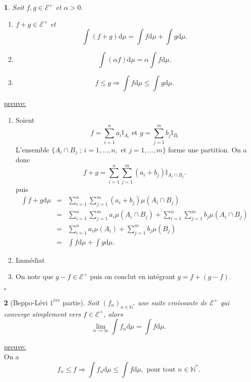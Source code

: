 \documentclass[8pt,notheorems]{beamer}
\def \N{\mathbb N}
\newtheorem{prop}{\translate{Proposition}}
\theoremstyle{definition}
\theoremstyle{example}
\theoremstyle{mystyle}
\theoremstyle{plain}
\begin{document}
\begin{frame}[allowframebreaks]
\begin{prop}
Soit $f,g\in \mathcal{E}^+$ et $\alpha>0$. 
\begin{enumerate}
    \item $f+g\in \mathcal{E}^+$ et 
    $$
    \int(f+g)\text{d}\mu = \int f \text{d}\mu + \int g\text{d}\mu. 
    $$
    \item 

    $$
    \int(\alpha f)\text{d}\mu = \alpha \int f\text{d}\mu.
    $$ 
    \item 
    $$
    f\leq g \Rightarrow \int f\text{d}\mu\leq \int g\text{d}\mu.  
    $$
\end{enumerate}
\end{prop} 
\underline{preuve:}\\
\begin{enumerate}
    \item Soient 
    $$
    f = \sum_{i = 1}^{n}a_i\mathbb{I}_{A_i}\text{ et }g = \sum_{j = 1}^{m}b_j\mathbb{I}_{B_i} 
    $$
    L'ensemble $\{A_i\cap B_j\text{ ; }i = 1,\ldots, n, \text{ et }j = 1,\ldots,m \}$ forme une partition. On a donc 
    $$
    f + g = \sum_{i = 1}^{n}\sum_{j = 1}^{m}(a_i+b_j)\mathbb{I}_{A_i\cap B_j}.
    $$
    puis
    \begin{eqnarray*}
    \int f + g \text{d} \mu &=& \sum_{i = 1}^{n}\sum_{j = 1}^{m}(a_i+b_j)\mu(A_i\cap B_j) \\
    &=& \sum_{i = 1}^{n}\sum_{j = 1}^{m}a_i\mu(A_i\cap B_j) + \sum_{i = 1}^{n}\sum_{j = 1}^{m}b_j\mu(A_i\cap B_j)\\
    &=& \sum_{i = 1}^{n}a_i\mu(A_i) + \sum_{j = 1}^{m}b_j\mu( B_j)\\
    &=& \int f\text{d}\mu + \int g\text{d}\mu.
    \end{eqnarray*} 
    \item Immédiat
    \item On note que $g - f \in \mathcal{E}^+$ puis on conclut en intégrant $g = f + (g-f)$.
\end{enumerate}
$\square$
\begin{prop}[Beppo-Lévi $1^{ère}$ partie]\label{prop:BL1}
Soit $(f_n)_{n\in \N^{\ast}}$ une suite croissante de $\mathcal{E}^+$ qui converge simplement vers $f\in \mathcal{E}^{+}$, alors 
$$
\underset{n\rightarrow \infty}{\lim}\int f_n\text{d}\mu =\int f \text{d}\mu.
$$
\end{prop}
\underline{preuve:}\\
On a 
$$
f_n\leq f\Rightarrow \int f_n\text{d}\mu \leq \int f\text{d}\mu,\text{ pour tout }n\in \N^{\ast}. 
$$
\end{frame}
\end{document}
